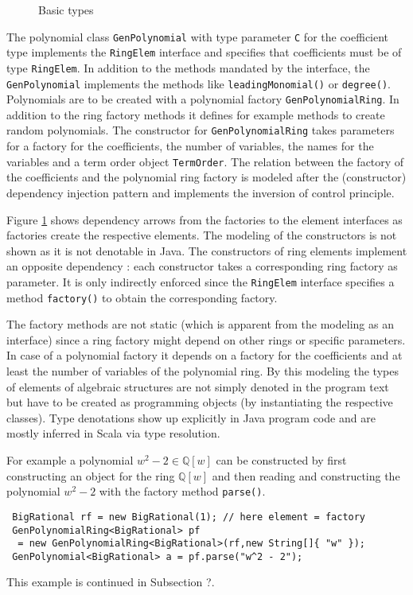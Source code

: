 \documentclass{llncs}
\newcommand{\code}[1]{\texttt{#1}}
\begin{document}
\begin{figure}[thb]
\centering
{}
\caption{Basic types}
\label{fig:bastype}
\end{figure}

The polynomial class \code{Gen\-Polynomial} with type parameter
\code{C} for the coefficient type implements the \code{Ring\-Elem}
interface and specifies that coefficients must be of type
\code{Ring\-Elem}.  In addition to the methods mandated by the
interface, the \code{Gen\-Polynomial} implements the methods like
\code{leading\-Monomial()} or \code{degree()}.  Polynomials are to be
created with a polynomial factory \code{Gen\-Polynomial\-Ring}. In
addition to the ring factory methods it defines for example methods
to create random polynomials.  The constructor for
\code{Gen\-Polynomial\-Ring} takes parameters for a factory for the
coefficients, the number of variables, the names for the variables and
a term order object \code{Term\-Order}. The relation between the
factory of the coefficients and the polynomial ring factory is modeled
after the (constructor) dependency injection pattern and implements the
inversion of control principle.

Figure \ref{fig:bastype} shows dependency arrows from the factories to
the element interfaces as factories create the respective elements.
The modeling of the constructors is not shown as it is not denotable
in Java. The constructors of ring elements implement an opposite
dependency : each constructor takes a corresponding ring
factory as parameter.  It is only indirectly enforced since the
\code{RingElem} interface specifies a method \code{factory()} to
obtain the corresponding factory.

The factory methods are not static (which is apparent from the
modeling as an interface) since a ring factory might depend on other
rings or specific parameters. In case of a polynomial factory it
depends on a factory for the coefficients and at least the number of
variables of the polynomial ring. By this modeling the types of
elements of algebraic structures are not simply denoted in the program
text but have to be created as programming objects (by instantiating
the respective classes). Type denotations show up explicitly in Java
program code and are mostly inferred in Scala via type resolution.

For example a polynomial $w^2 - 2 \in \mathbb{Q}[w]$ can be
constructed by first constructing an object for the ring
$\mathbb{Q}[w]$ and then reading and constructing the polynomial $w^2
- 2$ with the factory method \code{parse()}.
{\small
\begin{verbatim}
 BigRational rf = new BigRational(1); // here element = factory
 GenPolynomialRing<BigRational> pf 
  = new GenPolynomialRing<BigRational>(rf,new String[]{ "w" });
 GenPolynomial<BigRational> a = pf.parse("w^2 - 2");
\end{verbatim}
}
This example is continued in Subsection ?. %
\end{document}
